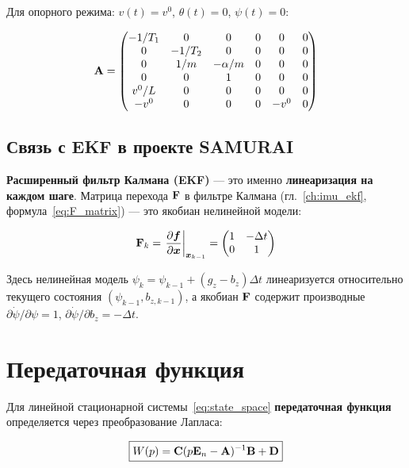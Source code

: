 Для опорного режима: $v(t) = v^0$, $\theta(t) = 0$, $\psi(t) = 0$:

\begin{equation}
  \mathbf{A} = \begin{pmatrix}
    -1/T_1 & 0 & 0 & 0 & 0 & 0\\
    0 & -1/T_2 & 0 & 0 & 0 & 0\\
    0 & 1/m & -\alpha/m & 0 & 0 & 0\\
    0 & 0 & 1 & 0 & 0 & 0\\
    v^0/L & 0 & 0 & 0 & 0 & 0\\
    -v^0 & 0 & 0 & 0 & -v^0 & 0
  \end{pmatrix}
  \label{eq:cart_A}
\end{equation}

\subsection{Связь с EKF в проекте SAMURAI}

\textbf{Расширенный фильтр Калмана (EKF)} --- это именно
\textbf{линеаризация на каждом шаге}. Матрица перехода $\mathbf{F}$
в фильтре Калмана (гл.~\ref{ch:imu_ekf}, формула~\eqref{eq:F_matrix})
--- это якобиан нелинейной модели:

\begin{equation}
  \mathbf{F}_k = \left.\frac{\partial \bm{f}}{\partial \bm{x}}\right|_{\bm{x}_{k-1}}
  = \begin{pmatrix} 1 & -\Delta t \\ 0 & 1 \end{pmatrix}
  \label{eq:ekf_jacobian}
\end{equation}

Здесь нелинейная модель $\psi_k = \psi_{k-1} + (g_z - b_z)\Delta t$
линеаризуется относительно текущего состояния $(\psi_{k-1}, b_{z,k-1})$,
а якобиан $\mathbf{F}$ содержит производные $\partial\dot{\psi}/\partial\psi = 1$,
$\partial\dot{\psi}/\partial b_z = -\Delta t$.

\section{Передаточная функция}
\label{sec:transfer_func}

Для линейной стационарной системы~\eqref{eq:state_space}
\textbf{передаточная функция} определяется через преобразование Лапласа:

\begin{equation}
  \boxed{W(p) = \mathbf{C}(p\mathbf{E}_n - \mathbf{A})^{-1}\mathbf{B} + \mathbf{D}}
  \label{eq:transfer_func}
\end{equation}

